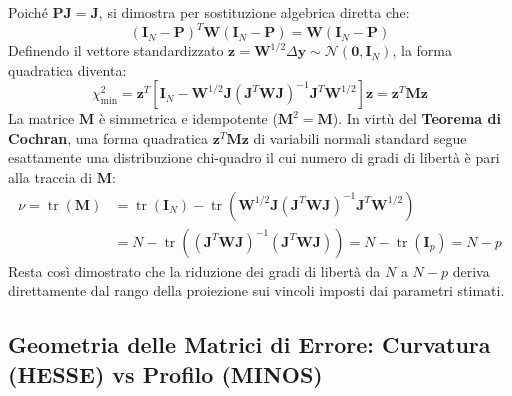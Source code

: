 \documentclass[11pt,a4paper]{article}
\begin{document}
Poiché $\mathbf{P} \mathbf{J} = \mathbf{J}$, si dimostra per sostituzione algebrica diretta che:
\begin{equation}
    (\mathbf{I}_N - \mathbf{P})^T \mathbf{W} (\mathbf{I}_N - \mathbf{P}) = \mathbf{W} (\mathbf{I}_N - \mathbf{P})
\end{equation}
Definendo il vettore standardizzato $\mathbf{z} = \mathbf{W}^{1/2} \Delta \mathbf{y} \sim \mathcal{N}(\mathbf{0}, \mathbf{I}_N)$, la forma quadratica diventa:
\begin{equation}
    \chi^2_{\text{min}} = \mathbf{z}^T \left[ \mathbf{I}_N - \mathbf{W}^{1/2} \mathbf{J} (\mathbf{J}^T \mathbf{W} \mathbf{J})^{-1} \mathbf{J}^T \mathbf{W}^{1/2} \right] \mathbf{z} = \mathbf{z}^T \mathbf{M} \mathbf{z}
\end{equation}
La matrice $\mathbf{M}$ è simmetrica e idempotente ($\mathbf{M}^2 = \mathbf{M}$). In virtù del \textbf{Teorema di Cochran}, una forma quadratica $\mathbf{z}^T \mathbf{M} \mathbf{z}$ di variabili normali standard segue esattamente una distribuzione chi-quadro il cui numero di gradi di libertà è pari alla traccia di $\mathbf{M}$:
\begin{align}
    \nu = \operatorname{tr}(\mathbf{M}) &= \operatorname{tr}(\mathbf{I}_N) - \operatorname{tr}\left( \mathbf{W}^{1/2} \mathbf{J} (\mathbf{J}^T \mathbf{W} \mathbf{J})^{-1} \mathbf{J}^T \mathbf{W}^{1/2} \right) \nonumber \\
    &= N - \operatorname{tr}\left( (\mathbf{J}^T \mathbf{W} \mathbf{J})^{-1} (\mathbf{J}^T \mathbf{W} \mathbf{J}) \right) = N - \operatorname{tr}(\mathbf{I}_p) = N - p
\end{align}
Resta così dimostrato che la riduzione dei gradi di libertà da $N$ a $N-p$ deriva direttamente dal rango della proiezione sui vincoli imposti dai parametri stimati.

\subsection{Geometria delle Matrici di Errore: Curvatura (HESSE) vs Profilo (MINOS)}
\end{document}

